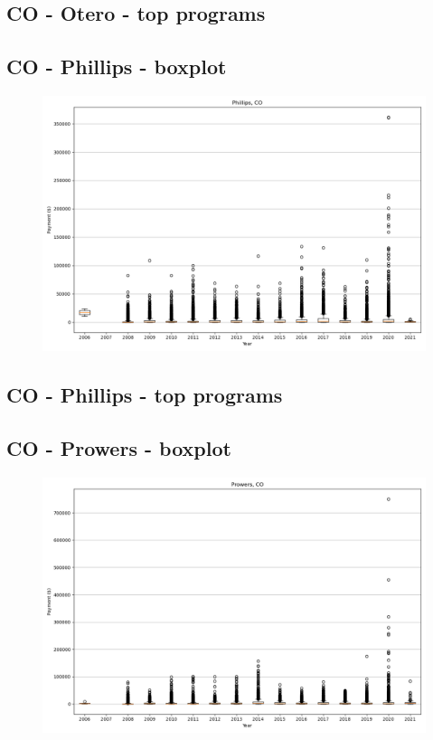 \subsection*{CO - Otero - top programs}

\newpage
\subsection*{CO - Phillips - boxplot}
\begin{figure}[h]
\centering
\includegraphics[width=7in]{../output/boxplots/counties/Phillips-CO_boxplot.png}
\end{figure}


\subsection*{CO - Phillips - top programs}

\newpage
\subsection*{CO - Prowers - boxplot}
\begin{figure}[h]
\centering
\includegraphics[width=7in]{../output/boxplots/counties/Prowers-CO_boxplot.png}
\end{figure}



